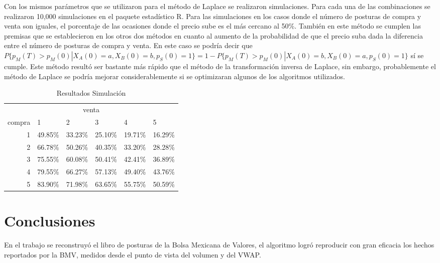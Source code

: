 \documentclass[11pt]{article}
\numberwithin{equation}{section} %
\begin{document}
Con los mismos parámetros que se utilizaron para el método de Laplace se realizaron simulaciones. Para cada una de las combinaciones se realizaron 10,000 simulaciones en el paquete estadístico R. Para las simulaciones en los casos donde el número de posturas de compra y venta son iguales, el porcentaje de las ocasiones donde el precio sube es el más cercano al 50\%. También en este método se cumplen las premisas que se establecieron en los otros dos métodos en cuanto al aumento de la probabilidad de que el precio suba dada la diferencia entre el número de posturas de compra y venta. En este caso se podría decir que $P\{p_M(T)>p_M(0)|X_A(0)=a,X_B(0)=b,p_S(0)=1\}=1-P\{p_M(T)>p_M(0)|X_A(0)=b,X_B(0)=a,p_S(0)=1\}$ sí se cumple. Este método resultó ser bastante más rápido que el método de la transformación inversa de Laplace, sin embargo, probablemente el método de Laplace se podría mejorar considerablemente si se optimizaran algunos de los algoritmos utilizados.

\begin{table}[htbp]
\centering
\caption{Resultados Simulación}
\begin{tabular}{r|p{1.5cm}|p{1.5cm}|p{1.5cm}|p{1.5cm}|p{1.5cm}|}
\multicolumn{6}{c}{venta}\\
\cline{2-6}
compra & 1& 2 & 3 & 4 & 5 \\
\cline{2-6}
1 & 49.85\% & 33.23\% & 25.10\% & 19.71\% & 16.29\% \\
2 & 66.78\% & 50.26\% & 40.35\% & 33.20\% & 28.28\% \\
3 & 75.55\% & 60.08\% & 50.41\% & 42.41\% & 36.89\% \\
4 & 79.55\% & 66.27\% & 57.13\% & 49.40\% & 43.76\% \\
5 & 83.90\% & 71.98\% & 63.65\% & 55.75\% & 50.59\% \\
\cline{2-6}
\end{tabular}%
\label{tab:ressim}%
\end{table}%

\clearpage

\section{Conclusiones}

En el trabajo se reconstruyó el libro de posturas de la Bolsa Mexicana de Valores, el algoritmo logró reproducir con gran eficacia los hechos reportados por la BMV, medidos desde el punto de vista del volumen y del VWAP.\\
\end{document}
